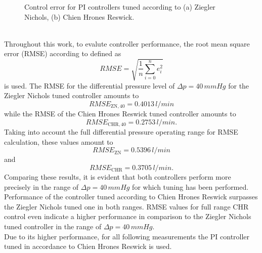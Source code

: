 \begin{figure}[ht]
  \centering
  \caption[Control error for PI Controllers]{Control error for PI controllers tuned according to (a) Ziegler Nichols, (b) Chien Hrones Reswick.}
  \label{fig:PI_error}
\end{figure}
\\Throughout this work, to evalute controller performance, the root mean square error (RMSE) according to \cite{RMSE} defined as
\begin{equation}
  RMSE = \sqrt{\frac{1}{n}\sum_{i=0}^n e_i^2}
\end{equation}
is used. The RMSE for the differential pressure level of $\Delta{p}=40\,mmHg$ for the Ziegler Nichols tuned controller amounts to
\begin{equation}
  RMSE_{\mathrm{ZN,40}}=0.4013\,l/min
\end{equation}
while the RMSE of the Chien Hrones Reswick tuned controller amounts to
\begin{equation}
  RMSE_{\mathrm{CHR,40}}=0.2753\,l/min.
\end{equation}
\newpage
Taking into account the full differential pressure operating range for RMSE calculation, these values amount to
\begin{equation}
  RMSE_{\mathrm{ZN}}=0.5396\,l/min
\end{equation}
and
\begin{equation}
  RMSE_{\mathrm{CHR}}=0.3705\,l/min.
\end{equation}
Comparing these results, it is evident that both controllers perform more precisely in the range of $\Delta{p}=40\,mmHg$ for which tuning has been performed.
Performance of the controller tuned according to Chien Hrones Reswick surpasses the Ziegler Nichols tuned one in both ranges. RMSE values for full range CHR control even indicate a higher performance in comparison to the Ziegler Nichols tuned controller in the range of $\Delta{p}=40\,mmHg$.
\\ Due to its higher performance, for all following measurements the PI controller tuned in accordance to Chien Hrones Reswick is used.
